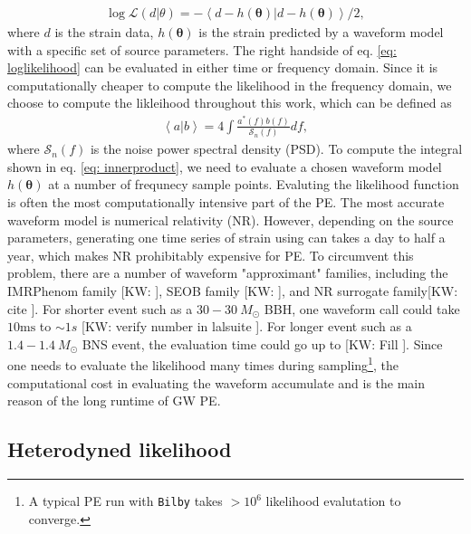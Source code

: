 \documentclass[twocolumn]{aastex631}
\newcommand{\kw}[1]{{\color{rb4}[KW: #1 ]}}
\begin{document}
\begin{align}
    \log{\mathcal{L}(d|\theta)} = -\left<d-h(\mathbf{\theta})|d-h(\mathbf{\theta})\right>/2,
\label{eq: loglikelihood}
\end{align}
where $d$ is the strain data, $h(\mathbf{\theta})$ is the strain predicted by a
waveform model with a specific set of source parameters. The right handside of
eq. \ref{eq: loglikelihood} can be evaluated in either time or frequency domain.
Since it is computationally cheaper to compute the likelihood in the frequency
domain, we choose to compute the likleihood throughout this work, which can be defined as 
\begin{align}
    \left<a|b\right> = 4 \int \frac{a^*(f)b(f)}{\mathcal{S}_n(f)} df,
\label{eq: innerproduct}
\end{align}
where $\mathcal{S}_n(f)$ is the noise power spectral density (PSD). To compute
the integral shown in eq. \ref{eq: innerproduct}, we need to evaluate a chosen
waveform model $h(\mathbf{\theta})$ at a number of frequnecy sample points.
Evaluting the likelihood function is often the most computationally intensive
part of the PE. The most accurate waveform model is numerical relativity (NR).
However, depending on the source parameters, generating one time series of
strain using can takes a day to half a year, which makes NR prohibitably
expensive for PE. To circumvent this problem, there are a number of waveform
"approximant" families, including the IMRPhenom family \kw{}, SEOB family \kw{},
and NR surrogate family\kw{cite}. For shorter event such as a $30-30\ M_{\odot}$
BBH, one waveform call could take $10\text{ms}$ to $\sim 1s$ \kw{verify number
in lalsuite}. For longer event such as a $1.4-1.4\ M_{\odot}$ BNS event, the
evaluation time could go up to \kw{Fill}. Since one needs to evaluate the
likelihood many times during sampling\footnote{A typical PE run with
\texttt{Bilby} takes $>10^6$ likelihood evalutation to converge.}, the
computational cost in evaluating the waveform accumulate and is the main reason
of the long runtime of GW PE.

\subsection{Heterodyned likelihood}
\end{document}
